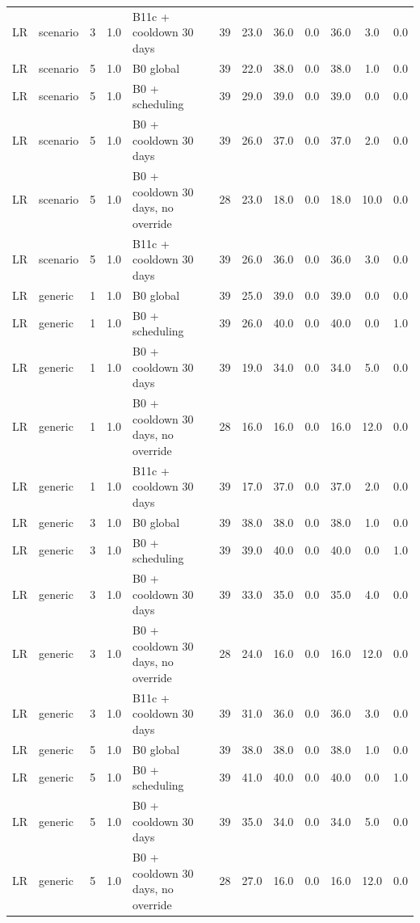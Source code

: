 \documentclass[10pt,onecolumn,letterpaper]{article}
\begin{document}
\begin{longtable}{lllllccccccc}
LR & scenario & 3 & 1.0 & B11c + cooldown 30 days & 39 & 23.0 & 36.0 & 0.0 & 36.0 & 3.0 & 0.0 \\
LR & scenario & 5 & 1.0 & B0 global & 39 & 22.0 & 38.0 & 0.0 & 38.0 & 1.0 & 0.0 \\
LR & scenario & 5 & 1.0 & B0 + scheduling & 39 & 29.0 & 39.0 & 0.0 & 39.0 & 0.0 & 0.0 \\
LR & scenario & 5 & 1.0 & B0 + cooldown 30 days & 39 & 26.0 & 37.0 & 0.0 & 37.0 & 2.0 & 0.0 \\
LR & scenario & 5 & 1.0 & B0 + cooldown 30 days, no override & 28 & 23.0 & 18.0 & 0.0 & 18.0 & 10.0 & 0.0 \\
LR & scenario & 5 & 1.0 & B11c + cooldown 30 days & 39 & 26.0 & 36.0 & 0.0 & 36.0 & 3.0 & 0.0 \\
LR & generic & 1 & 1.0 & B0 global & 39 & 25.0 & 39.0 & 0.0 & 39.0 & 0.0 & 0.0 \\
LR & generic & 1 & 1.0 & B0 + scheduling & 39 & 26.0 & 40.0 & 0.0 & 40.0 & 0.0 & 1.0 \\
LR & generic & 1 & 1.0 & B0 + cooldown 30 days & 39 & 19.0 & 34.0 & 0.0 & 34.0 & 5.0 & 0.0 \\
LR & generic & 1 & 1.0 & B0 + cooldown 30 days, no override & 28 & 16.0 & 16.0 & 0.0 & 16.0 & 12.0 & 0.0 \\
LR & generic & 1 & 1.0 & B11c + cooldown 30 days & 39 & 17.0 & 37.0 & 0.0 & 37.0 & 2.0 & 0.0 \\
LR & generic & 3 & 1.0 & B0 global & 39 & 38.0 & 38.0 & 0.0 & 38.0 & 1.0 & 0.0 \\
LR & generic & 3 & 1.0 & B0 + scheduling & 39 & 39.0 & 40.0 & 0.0 & 40.0 & 0.0 & 1.0 \\
LR & generic & 3 & 1.0 & B0 + cooldown 30 days & 39 & 33.0 & 35.0 & 0.0 & 35.0 & 4.0 & 0.0 \\
LR & generic & 3 & 1.0 & B0 + cooldown 30 days, no override & 28 & 24.0 & 16.0 & 0.0 & 16.0 & 12.0 & 0.0 \\
LR & generic & 3 & 1.0 & B11c + cooldown 30 days & 39 & 31.0 & 36.0 & 0.0 & 36.0 & 3.0 & 0.0 \\
LR & generic & 5 & 1.0 & B0 global & 39 & 38.0 & 38.0 & 0.0 & 38.0 & 1.0 & 0.0 \\
LR & generic & 5 & 1.0 & B0 + scheduling & 39 & 41.0 & 40.0 & 0.0 & 40.0 & 0.0 & 1.0 \\
LR & generic & 5 & 1.0 & B0 + cooldown 30 days & 39 & 35.0 & 34.0 & 0.0 & 34.0 & 5.0 & 0.0 \\
LR & generic & 5 & 1.0 & B0 + cooldown 30 days, no override & 28 & 27.0 & 16.0 & 0.0 & 16.0 & 12.0 & 0.0 \\

\end{longtable}
\end{document}
